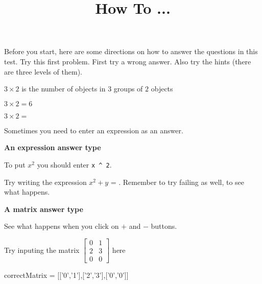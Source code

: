 \documentclass{ximera}
\title{How To ...}
\begin{document}
\maketitle
Before you start, here are some directions on how to answer the questions in this test. 
Try this first problem. First try a wrong answer. Also try the hints (there are three levels of them). 
\begin{question}
\begin{solution}
\begin{hint}
$3 \times 2$ is the number of objects in $3$ groups of $2$ objects
\end{hint}
\begin{hint}
\end{hint}
\begin{hint}
$3\times 2=6$
\end{hint}
$3\times 2 = $ 
\end{solution}
\end{question}

Sometimes you need to enter an expression as an answer. 
\begin{question}
\textbf{An expression answer type}
\begin{solution}
\begin{hint}
To put $x^2$ you should enter \verb+x ^ 2+.
\end{hint}
Try writing the expression $x^2+y$ = . Remember to try failing as well, to see what happens.
\end{solution}
\end{question}

\begin{question}
\textbf{A matrix answer type}
\begin{solution}
\begin{hint}
See what happens when you click on $+$ and $-$ buttons.
\end{hint}
Try inputing the matrix $\begin{bmatrix} 0&1\\2&3\\0&0\end{bmatrix}$ here
\begin{matrix-answer}[name=M]
correctMatrix = [['0','1'],['2','3'],['0','0']]
\end{matrix-answer}
\end{solution}
\end{question}
\end{document}

